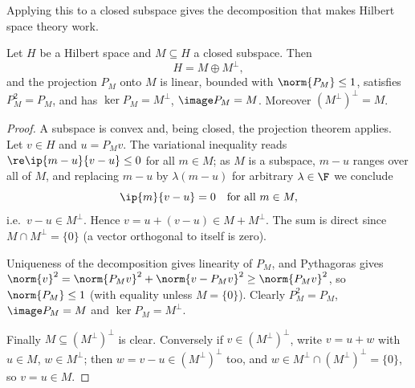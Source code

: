 Applying this to a closed subspace gives the decomposition that makes Hilbert space theory work.

\begin{theorem}
	Let $H$ be a Hilbert space and $M \subseteq H$ a closed subspace. Then
	$$H = M \oplus M^\perp,$$
	and the projection $P_M$ onto $M$ is linear, bounded with $\norm{P_M}\leq 1$, satisfies $P_M^2 = P_M$, and has $\ker P_M = M^\perp$, $\image P_M = M$. Moreover $(M^\perp)^\perp = M$.
\end{theorem}

\begin{proof}
	A subspace is convex and, being closed, the projection theorem applies. Let $v \in H$ and $u = P_M v$. The variational inequality reads $\re \ip{m - u}{v-u}\leq 0$ for all $m \in M$; as $M$ is a subspace, $m - u$ ranges over all of $M$, and replacing $m-u$ by $\lambda(m-u)$ for arbitrary $\lambda \in \F$ we conclude
	$$\ip{m}{v - u} = 0 \quad \text{for all } m \in M,$$
	i.e.\ $v - u \in M^\perp$. Hence $v = u + (v-u) \in M + M^\perp$. The sum is direct since $M \cap M^\perp = \{0\}$ (a vector orthogonal to itself is zero).

	Uniqueness of the decomposition gives linearity of $P_M$, and Pythagoras gives $\norm{v}^2 = \norm{P_Mv}^2 + \norm{v - P_Mv}^2 \geq \norm{P_M v}^2$, so $\norm{P_M}\leq 1$ (with equality unless $M = \{0\}$). Clearly $P_M^2 = P_M$, $\image P_M = M$ and $\ker P_M = M^\perp$.

	Finally $M \subseteq (M^\perp)^\perp$ is clear. Conversely if $v \in (M^\perp)^\perp$, write $v = u + w$ with $u \in M$, $w \in M^\perp$; then $w = v - u \in (M^\perp)^\perp$ too, and $w \in M^\perp \cap (M^\perp)^\perp = \{0\}$, so $v = u \in M$.
\end{proof}

\begin{center}
\end{center}

